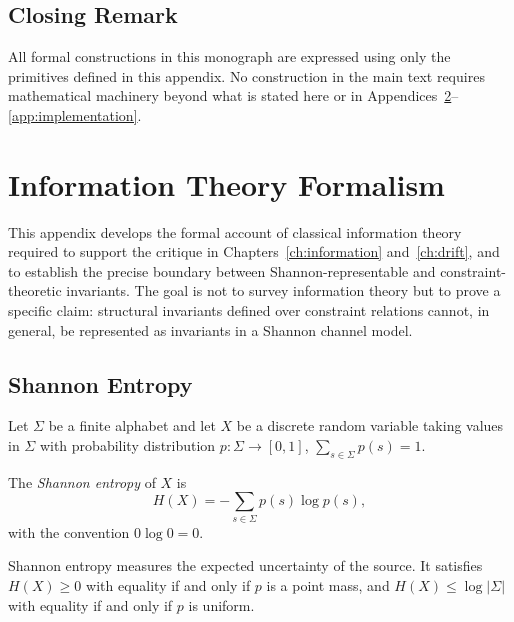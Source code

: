 \documentclass[11pt,openany]{book}
\begin{document}
\section{Closing Remark}
\label{sec:closing-remark}

All formal constructions in this monograph are expressed
using only the primitives defined in this appendix.  No
construction in the main text requires mathematical
machinery beyond what is stated here or in
Appendices~\ref{app:information}--\ref{app:implementation}.


\chapter{Information Theory Formalism}
\label{app:information}

This appendix develops the formal account of classical
information theory required to support the critique in
Chapters~\ref{ch:information} and~\ref{ch:drift}, and to
establish the precise boundary between Shannon-representable
and constraint-theoretic invariants.  The goal is not to
survey information theory but to prove a specific claim:
structural invariants defined over constraint relations
cannot, in general, be represented as invariants in a
Shannon channel model.

\section{Shannon Entropy}
\label{sec:shannon-entropy}

Let $\Sigma$ be a finite alphabet and let $X$ be a discrete
random variable taking values in $\Sigma$ with probability
distribution $p : \Sigma \to [0,1]$, $\sum_{s \in \Sigma}
p(s) = 1$.

\begin{definition}
The \emph{Shannon entropy} of $X$ is
\[
  H(X) = -\sum_{s \in \Sigma} p(s) \log p(s),
\]
with the convention $0 \log 0 = 0$.
\end{definition}

Shannon entropy measures the expected uncertainty of the
source.  It satisfies $H(X) \ge 0$ with equality if and
only if $p$ is a point mass, and $H(X) \le \log |\Sigma|$
with equality if and only if $p$ is uniform.
\end{document}

